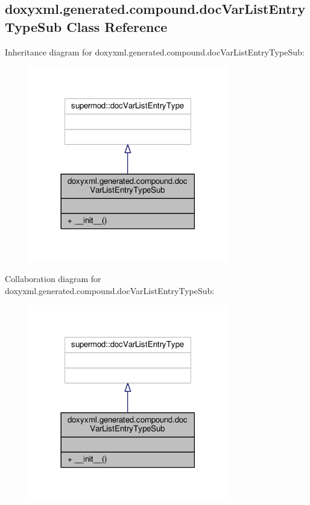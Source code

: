 \subsection{doxyxml.\+generated.\+compound.\+doc\+Var\+List\+Entry\+Type\+Sub Class Reference}
\label{classdoxyxml_1_1generated_1_1compound_1_1docVarListEntryTypeSub}


Inheritance diagram for doxyxml.\+generated.\+compound.\+doc\+Var\+List\+Entry\+Type\+Sub\+:
\nopagebreak
\begin{figure}[H]
\begin{center}
\leavevmode
\includegraphics[width=246pt]{dd/dd7/classdoxyxml_1_1generated_1_1compound_1_1docVarListEntryTypeSub__inherit__graph}
\end{center}
\end{figure}


Collaboration diagram for doxyxml.\+generated.\+compound.\+doc\+Var\+List\+Entry\+Type\+Sub\+:
\nopagebreak
\begin{figure}[H]
\begin{center}
\leavevmode
\includegraphics[width=246pt]{de/d28/classdoxyxml_1_1generated_1_1compound_1_1docVarListEntryTypeSub__coll__graph}
\end{center}
\end{figure}
